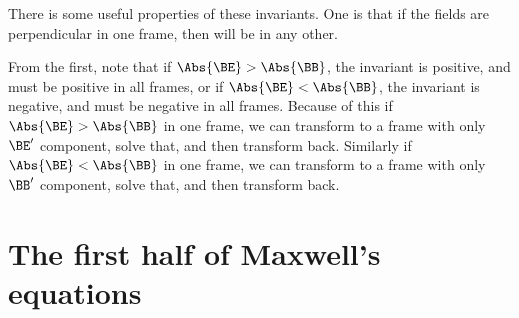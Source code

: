 There is some useful properties of these invariants.  One is that if the fields are perpendicular in one frame, then will be in any other.

From the first, note that if \(\Abs{\BE} > \Abs{\BB}\), the invariant is positive, and must be positive in all frames, or if \(\Abs{\BE} < \Abs{\BB}\), the invariant is negative, and must be negative in all frames.  Because of this if \(\Abs{\BE} > \Abs{\BB}\) in one frame, we can transform to a frame with only \(\BE'\) component, solve that, and then transform back.  Similarly if \(\Abs{\BE} < \Abs{\BB}\) in one frame, we can transform to a frame with only \(\BB'\) component, solve that, and then transform back.
%
\section{The first half of Maxwell's equations}
%
